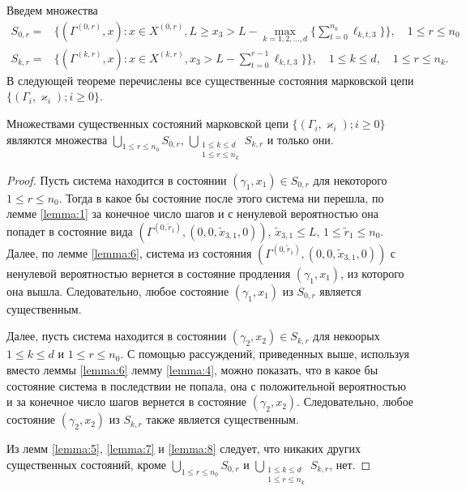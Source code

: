 \documentclass[a4paper,12pt,russian]{extarticle}
\newcommand{\ga}[1]{\Gamma^{\left( #1 \right)} }
\newcommand{\Mark}{\{(\Gamma_i, \varkappa_i); i \geqslant 0\}}
\begin{document}
Введем множества
\begin{equation*}
\begin{aligned}
S_{0,r} = & \{(\ga{0,r},x) \colon x\in X^{(0,r)}, L \geqslant x_3 > L - \max\limits_{k=1, 2, \ldots, d}\{\sum_{t=0}^{n_k} \ell_{k,t,3}\}\}, \quad 1 \leqslant r \leqslant n_0 \\
S_{k,r} = & \{(\ga{k,r},x) \colon x\in X^{(k,r)},x_3 > L - \sum_{t=0}^{r-1} \ell_{k,t,3}\} \}, \quad 1 \leqslant k \leqslant d,\quad 1 \leqslant r \leqslant n_k.
\end{aligned}
\end{equation*}
В следующей теореме перечислены все существенные состояния марковской цепи $\Mark$.
\begin{theorem}
Множествами существенных состояний марковской цепи $\Mark$ являются множества $\bigcup\limits_{1 \leqslant r \leqslant n_0}S_{0,r}$, $\bigcup\limits_{\substack{1 \leqslant k \leqslant d\\ 1 \leqslant r \leqslant n_k}} S_{k,r}$ и только они.
\end{theorem}
\begin{proof}
Пусть система находится в состоянии $(\gamma_1,x_1) \in S_{0,r}$ для некоторого $1 \leqslant r \leqslant n_0$. Тогда в какое бы состояние после этого система ни перешла, по лемме \ref{lemma:1} за конечное число шагов и с ненулевой вероятностью она попадет в состояние вида $(\ga{0,\tilde{r}_1}, (0,0,\tilde{x}_{3,1},0))$, $\tilde{x}_{3,1} \leqslant L$, $1 \leqslant \tilde{r}_1 \leqslant n_0$.  Далее, по лемме \ref{lemma:6}, система из состояния $(\ga{0,\tilde{r}_1}, (0,0,\tilde{x}_{3,1},0))$ с ненулевой вероятностью вернется в состояние продления $(\gamma_1,x_1)$, из которого она вышла. Следовательно, любое состояние $(\gamma_1,x_1)$ из $S_{0,r}$ является существенным.

Далее, пусть система находится в состоянии $(\gamma_2,x_2) \in S_{k,r}$ для некоорых $1 \leqslant k \leqslant d$ и  $1 \leqslant r \leqslant n_0$. С помощью рассуждений, приведенных выше, используя вместо леммы \ref{lemma:6} лемму \ref{lemma:4}, можно показать, что в какое бы состояние система в последствии не попала, она с положительной вероятностью и за конечное число шагов вернется в состояние $(\gamma_2,x_2)$. Следовательно, любое состояние $(\gamma_2,x_2)$ из $S_{k,r}$ также является существенным.

Из лемм \ref{lemma:5}, \ref{lemma:7} и \ref{lemma:8} следует, что никаких других существенных состояний, кроме $\bigcup\limits_{1 \leqslant r \leqslant n_0}S_{0,r}$ и $\bigcup\limits_{\substack{1 \leqslant k \leqslant d\\ 1 \leqslant r \leqslant n_k}} S_{k,r}$,  нет.
\end{proof}
\end{document}
